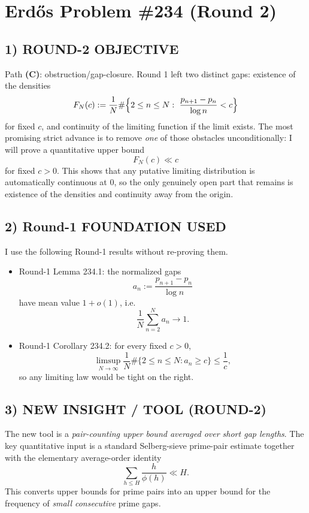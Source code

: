 \section*{Erd\H{o}s Problem \#234 (Round 2)}

\subsection*{1) ROUND-2 OBJECTIVE}

Path \textbf{(C)}: obstruction/gap-closure. Round 1 left two distinct gaps: existence of the densities
\[
F_N(c):=\frac{1}{N}\#\Bigl\{2\le n\le N:\ \frac{p_{n+1}-p_n}{\log n}<c\Bigr\}
\]
for fixed $c$, and continuity of the limiting function if the limit exists. The most promising strict advance is to remove \emph{one} of those obstacles unconditionally: I will prove a quantitative upper bound
\[
F_N(c)\ll c
\]
for fixed $c>0$. This shows that any putative limiting distribution is automatically continuous at $0$, so the only genuinely open part that remains is existence of the densities and continuity away from the origin.

\subsection*{2) Round-1 FOUNDATION USED}

I use the following Round-1 results without re-proving them.

\begin{itemize}
\item Round-1 Lemma 234.1: the normalized gaps
\[
a_n:=\frac{p_{n+1}-p_n}{\log n}
\]
have mean value $1+o(1)$, i.e.
\[
\frac{1}{N}\sum_{n=2}^{N} a_n \to 1.
\]
\item Round-1 Corollary 234.2: for every fixed $c>0$,
\[
\limsup_{N\to\infty}\frac{1}{N}\#\{2\le n\le N: a_n\ge c\}\le \frac{1}{c},
\]
so any limiting law would be tight on the right.
\end{itemize}

\subsection*{3) NEW INSIGHT / TOOL (ROUND-2)}

The new tool is a \emph{pair-counting upper bound averaged over short gap lengths}. The key quantitative input is a standard Selberg-sieve prime-pair estimate together with the elementary average-order identity
\[
\sum_{h\le H}\frac{h}{\phi(h)}\ll H.
\]
This converts upper bounds for prime pairs into an upper bound for the frequency of \emph{small consecutive} prime gaps.


